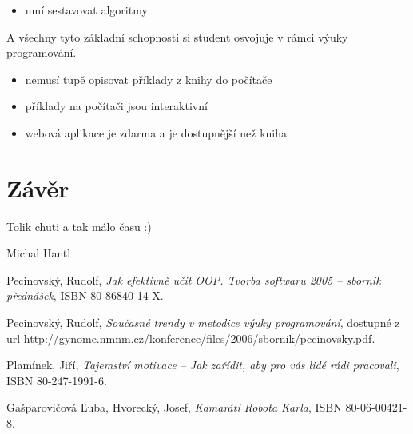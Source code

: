 \begin{itemize}
	\item{umí sestavovat algoritmy}
\end{itemize}

A všechny tyto základní schopnosti si student osvojuje v rámci výuky programování. 

\begin{itemize}
	\item nemusí tupě opisovat příklady z knihy do počítače
	\item příklady na počítači jsou interaktivní
	\item webová aplikace je zdarma a je dostupnější než kniha
\end{itemize}




\section{Závěr}
\label{sec:Conclusion}

Tolik chuti a tak málo času :)

\bigskip
\begin{flushright}
Michal Hantl
\end{flushright}






\begin{thebibliography}{99}


 Pecinovský, Rudolf,
\textit{Jak efektivně učit OOP. Tvorba softwaru 2005 – sborník přednášek}, ISBN 80-86840-14-X.

 Pecinovský, Rudolf,
\textit{Současné trendy v metodice výuky programování}, dostupné z url \url{http://gynome.nmnm.cz/konference/files/2006/sbornik/pecinovsky.pdf}.

 Plamínek, Jiří,
\textit{Tajemství motivace – Jak zařídit, aby pro vás lidé rádi pracovali}, ISBN 80-247-1991-6.

 Gašparovičová Ľuba, Hvorecký, Josef,
\textit{Kamaráti Robota Karla}, ISBN 80-06-00421-8.

\end{thebibliography}






